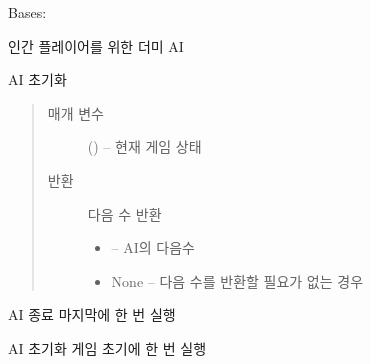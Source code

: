 \documentclass[letterpaper,10pt,english]{sphinxmanual}
\begin{document}
\begin{fulllineitems}
\label{\detokenize{agents.basic:agents.basic.human.Player}}
Bases: {\hyperref[\detokenize{agents:agents.BaseAgent}]{}}

인간 플레이어를 위한 더미 AI

\begin{fulllineitems}
\label{\detokenize{agents.basic:agents.basic.human.Player.act}}
AI 초기화
\begin{quote}\begin{description}
\item[{매개 변수}] \leavevmode
{} ({\hyperref[\detokenize{scripts:scripts.run_game.State}]{}}) -- 현재 게임 상태

\item[{반환}] \leavevmode

다음 수 반환
\begin{itemize}
\item {} 
 -- AI의 다음수

\item {} 
None -- 다음 수를 반환할 필요가 없는 경우

\end{itemize}


\end{description}\end{quote}

\end{fulllineitems}


\begin{fulllineitems}
\label{\detokenize{agents.basic:agents.basic.human.Player.close}}
AI 종료
마지막에 한 번 실행

\end{fulllineitems}


\begin{fulllineitems}
\label{\detokenize{agents.basic:agents.basic.human.Player.reset}}
AI 초기화
게임 초기에 한 번 실행

\end{fulllineitems}


\end{fulllineitems}
\end{document}
